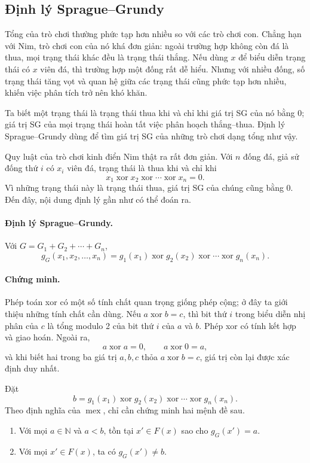 \documentclass[11pt]{article}
\newcommand{\mex}{\operatorname{mex}}
\newcommand{\xor}{\mathbin{\operatorname{xor}}}
\begin{document}
\subsection{Định lý Sprague--Grundy}

Tổng của trò chơi thường phức tạp hơn nhiều so với các trò chơi con. Chẳng hạn
với Nim, trò chơi con của nó khá đơn giản: ngoài trường hợp không còn đá là
thua, mọi trạng thái khác đều là trạng thái thắng. Nếu dùng \(x\) để biểu diễn
trạng thái có \(x\) viên đá, thì trường hợp một đống rất dễ hiểu. Nhưng với
nhiều đống, số trạng thái tăng vọt và quan hệ giữa các trạng thái cũng phức
tạp hơn nhiều, khiến việc phân tích trở nên khó khăn.

Ta biết một trạng thái là trạng thái thua khi và chỉ khi giá trị SG của nó bằng
0; giá trị SG của mọi trạng thái hoàn tất việc phân hoạch thắng--thua. Định lý
Sprague--Grundy dùng để tìm giá trị SG của những trò chơi dạng tổng như vậy.

Quy luật của trò chơi kinh điển Nim thật ra rất đơn giản. Với \(n\) đống đá,
giả sử đống thứ \(i\) có \(x_i\) viên đá, trạng thái là thua khi và chỉ khi
\[
  x_1\xor x_2\xor\cdots\xor x_n=0.
\]
Vì những trạng thái này là trạng thái thua, giá trị SG của chúng cũng bằng 0.
Đến đây, nội dung định lý gần như có thể đoán ra.

\paragraph{Định lý Sprague--Grundy.}
Với \(G=G_1+G_2+\cdots+G_n\),
\[
  g_G(x_1,x_2,\ldots,x_n)=
  g_1(x_1)\xor g_2(x_2)\xor\cdots\xor g_n(x_n).
\]

\paragraph{Chứng minh.}
Phép toán xor có một số tính chất quan trọng giống phép cộng; ở đây ta giới
thiệu những tính chất cần dùng. Nếu \(a\xor b=c\), thì bit thứ \(i\) trong biểu
diễn nhị phân của \(c\) là tổng modulo 2 của bit thứ \(i\) của \(a\) và \(b\).
Phép xor có tính kết hợp và giao hoán. Ngoài ra,
\[
  a\xor a=0,\qquad a\xor 0=a,
\]
và khi biết hai trong ba giá trị \(a,b,c\) thỏa \(a\xor b=c\), giá trị còn lại
được xác định duy nhất.

Đặt
\[
  b=g_1(x_1)\xor g_2(x_2)\xor\cdots\xor g_n(x_n).
\]
Theo định nghĩa của \(\mex\), chỉ cần chứng minh hai mệnh đề sau.

\begin{enumerate}
  \item Với mọi \(a\in\mathbb{N}\) và \(a<b\), tồn tại \(x'\in F(x)\) sao cho
  \(g_G(x')=a\).
  \item Với mọi \(x'\in F(x)\), ta có \(g_G(x')\ne b\).
\end{enumerate}
\end{document}
